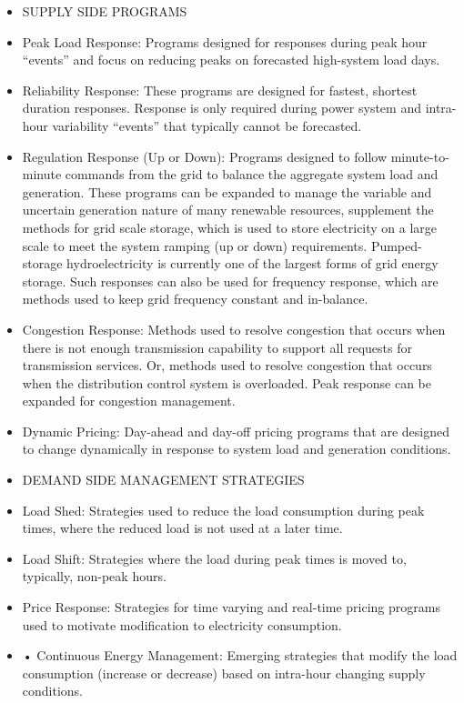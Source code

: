 \begin{itemize}
\item SUPPLY SIDE PROGRAMS
\item Peak Load Response: Programs designed for responses during peak hour “events” and focus on reducing peaks on 
forecasted high-system load days. 
\item Reliability Response: These programs are designed for fastest, shortest duration responses. 
Response is only required during power system and intra-hour variability “events” that typically cannot be forecasted.
\item Regulation Response (Up or Down): Programs designed to follow minute-to-minute commands from the grid to 
balance the aggregate system load and generation. These programs can be expanded to manage the variable and 
uncertain generation nature of many renewable resources, supplement the methods for grid scale storage, which is 
used to store electricity on a large scale to meet the system ramping (up or down) requirements. Pumped-storage 
hydroelectricity is currently one of the largest forms of grid energy storage. Such 
responses can also be used for frequency response, which are methods used to keep grid frequency constant 
and in-balance.
\item Congestion Response: Methods used to resolve congestion that occurs when there is not enough transmission 
capability to support all requests for transmission services.  Or, methods used to resolve congestion 
that occurs when the distribution control system is overloaded. Peak response can be expanded for 
congestion management.
\item Dynamic Pricing: Day-ahead and day-off pricing programs that are designed to change dynamically in response 
to system load and generation conditions.  
\item DEMAND SIDE MANAGEMENT STRATEGIES
\item Load Shed: Strategies used to reduce the load consumption during peak times, 
where the reduced load is not used at a later time.
\item Load Shift:  Strategies where the load during peak times is moved to, typically, non-peak hours.
\item Price Response:  Strategies for time varying and real-time pricing programs used to motivate modification 
to electricity consumption. 
\item •	Continuous Energy Management: Emerging strategies that modify the load consumption (increase or decrease) 
based on intra-hour changing supply conditions.
\end{itemize}

